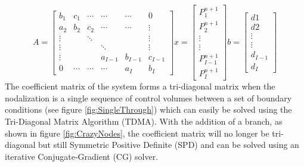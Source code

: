 \documentclass[11pt,letterpaper,titlepage]{article}
\begin{document}
\begin{equation*}
A=
\begin{bmatrix}
b_1    & c_1     & \cdots & \cdots & \cdots & 0      \\
a_2    & b_2     & c_2    & \cdots & \cdots & \vdots \\
\vdots &         & \ddots &        &        & \vdots \\
\vdots &         &        & \ddots &        & \vdots \\
\vdots &         &        &a_{I-1} &b_{I-1} &c_{I-1}  \\
0      & \cdots  & \cdots & \cdots & a_I    & b_I 
\end{bmatrix}
x=
\begin{bmatrix}
P_1^{n+1} \\
P_2^{n+1} \\
\vdots \\
\vdots \\
P_{I-1}^{n+1} \\
P_I^{n+1} 
\end{bmatrix}
b=
\begin{bmatrix}
d1 \\
d2 \\
\vdots \\
\vdots \\
d_{I-1}\\
d_I
\end{bmatrix}
\end{equation*}
\newline
\newline
The coefficient matrix of the system forms a tri-diagonal matrix when the nodalization is a single sequence of control volumes between a set of boundary conditions (see figure \ref{fig:SingleThrough}) which can easily be solved using the Tri-Diagonal Matrix Algorithm (TDMA). With the addition of a branch, as shown in figure \ref{fig:CrazyNodes}, the coefficient matrix will no longer be tri-diagonal but still Symmetric Positive Definite (SPD) and can be solved using an iterative Conjugate-Gradient (CG) solver.   
\end{document}
